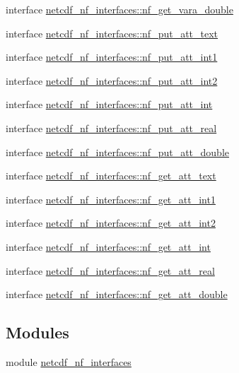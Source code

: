 \begin{DoxyCompactItemize}
\item 
interface \hyperlink{interfacenetcdf__nf__interfaces_1_1nf__get__vara__double}{netcdf\+\_\+nf\+\_\+interfaces\+::nf\+\_\+get\+\_\+vara\+\_\+double}
\item 
interface \hyperlink{interfacenetcdf__nf__interfaces_1_1nf__put__att__text}{netcdf\+\_\+nf\+\_\+interfaces\+::nf\+\_\+put\+\_\+att\+\_\+text}
\item 
interface \hyperlink{interfacenetcdf__nf__interfaces_1_1nf__put__att__int1}{netcdf\+\_\+nf\+\_\+interfaces\+::nf\+\_\+put\+\_\+att\+\_\+int1}
\item 
interface \hyperlink{interfacenetcdf__nf__interfaces_1_1nf__put__att__int2}{netcdf\+\_\+nf\+\_\+interfaces\+::nf\+\_\+put\+\_\+att\+\_\+int2}
\item 
interface \hyperlink{interfacenetcdf__nf__interfaces_1_1nf__put__att__int}{netcdf\+\_\+nf\+\_\+interfaces\+::nf\+\_\+put\+\_\+att\+\_\+int}
\item 
interface \hyperlink{interfacenetcdf__nf__interfaces_1_1nf__put__att__real}{netcdf\+\_\+nf\+\_\+interfaces\+::nf\+\_\+put\+\_\+att\+\_\+real}
\item 
interface \hyperlink{interfacenetcdf__nf__interfaces_1_1nf__put__att__double}{netcdf\+\_\+nf\+\_\+interfaces\+::nf\+\_\+put\+\_\+att\+\_\+double}
\item 
interface \hyperlink{interfacenetcdf__nf__interfaces_1_1nf__get__att__text}{netcdf\+\_\+nf\+\_\+interfaces\+::nf\+\_\+get\+\_\+att\+\_\+text}
\item 
interface \hyperlink{interfacenetcdf__nf__interfaces_1_1nf__get__att__int1}{netcdf\+\_\+nf\+\_\+interfaces\+::nf\+\_\+get\+\_\+att\+\_\+int1}
\item 
interface \hyperlink{interfacenetcdf__nf__interfaces_1_1nf__get__att__int2}{netcdf\+\_\+nf\+\_\+interfaces\+::nf\+\_\+get\+\_\+att\+\_\+int2}
\item 
interface \hyperlink{interfacenetcdf__nf__interfaces_1_1nf__get__att__int}{netcdf\+\_\+nf\+\_\+interfaces\+::nf\+\_\+get\+\_\+att\+\_\+int}
\item 
interface \hyperlink{interfacenetcdf__nf__interfaces_1_1nf__get__att__real}{netcdf\+\_\+nf\+\_\+interfaces\+::nf\+\_\+get\+\_\+att\+\_\+real}
\item 
interface \hyperlink{interfacenetcdf__nf__interfaces_1_1nf__get__att__double}{netcdf\+\_\+nf\+\_\+interfaces\+::nf\+\_\+get\+\_\+att\+\_\+double}
\end{DoxyCompactItemize}
\subsection*{Modules}
\begin{DoxyCompactItemize}
\item 
module \hyperlink{namespacenetcdf__nf__interfaces}{netcdf\+\_\+nf\+\_\+interfaces}
\end{DoxyCompactItemize}
